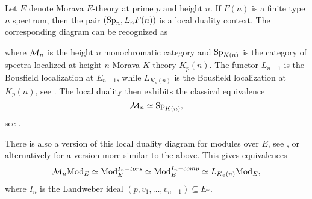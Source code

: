 \begin{example}
    \label{ch1:ex:local-duality-chromatic}
    Let $E$ denote Morava $E$-theory at prime $p$ and height $n$. If $F(n)$ is a finite type $n$ spectrum, then the pair $(\mathrm{Sp}_{n}, L_n F(n) )$ is a local duality context. The corresponding diagram can be recognized as
    \begin{center}
    \end{center}
    where $\mathcal{M}_{n}$ is the height $n$ monochromatic category and $\mathrm{Sp}_{{K(n)}}$ is the category of spectra localized at height $n$ Morava $K$-theory $K_p(n)$. The functor $L_{n-1}$ is the Bousfield localization at $E_{n-1}$, while $L_{K_p(n)}$ is the Bousfield localization at $K_p(n)$, see \cite{bousfield_1979_localization}. The local duality then exhibits the classical equivalence 
    \[\mathcal{M}_{n}\simeq \mathrm{Sp}_{{K(n)}},\] 
    see \cite[6.19]{hovey-strickland_99}. 
\end{example}

\begin{remark}
    \label{ch1:rm:local-duality-modules}
    There is also a version of this local duality diagram for modules over $E$, see \cite[4.2, 5.1]{greenlees-may_1995}, or alternatively \cite[3.7]{barthel-heard-valenzuela_2018} for a version more similar to the above. This gives equivalences 
    \[\mathcal{M}_{n}\mathrm{Mod}_E\simeq \mathrm{Mod}_E^{I_n-tors}\simeq \mathrm{Mod}_E^{I_n-comp}\simeq L_{K_p(n)}\mathrm{Mod}_E,\]
    where $I_n$ is the Landweber ideal $(p,v_1, \ldots, v_{n-1})\subseteq E_*$.
\end{remark}

